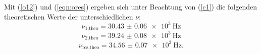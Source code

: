Mit (\ref{o12}) und (\ref{eqn:ores}) ergeben sich unter Beachtung von (\ref{c1})
die folgenden theoretischen Werte der unterschiedlichen $\nu$:
\begin{equation*}
  \nu_{\text{1,theo}} = \SI{30.43(6)e3}{\hertz}
\end{equation*}
\begin{equation*}
  \nu_{\text{2,theo}} = \SI{39.24(8)e3}{\hertz}
\end{equation*}
\begin{equation*}
  \nu_{\text{res,theo}} = \SI{34.56(7)e3}{\hertz}.
\end{equation*}







